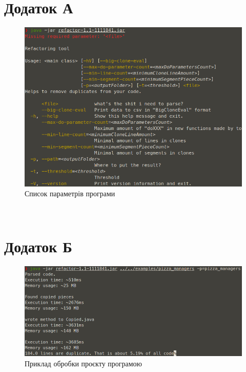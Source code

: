 \documentclass[a4paper, 14pt]{article}
\begin{document}
\section*{Додаток А}
\setcounter{figure}{0}    
\begin{figure}[h]
    \centering
    \includegraphics[width=\textwidth]{add1}
    \caption{\centering Список параметрів програми}
\end{figure} \hfill \\
\section*{Додаток Б}
\begin{figure}[h]
    \centering
    \includegraphics[width=\textwidth]{add2}
    \caption{\centering Приклад обробки проєкту програмою}
\end{figure} \hfill \\
\end{document}
